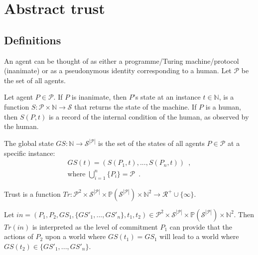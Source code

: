 \section{Abstract trust}
  \subsection{Definitions}
    \begin{definition}[Agent]
       An agent can be thought of as either a programme/Turing machine/protocol (inanimate) or as a pseudonymous identity
       corresponding to a human. Let $\mathcal{P}$ be the set of all agents.
    \end{definition}
    \begin{definition}[State]
      Let agent $P \in \mathcal{P}$. If $P$ is inanimate, then $P$'s state at an instance $t \in \mathbb{N}$, is a function $S :
      \mathcal{P} \times \mathbb{N} \rightarrow \mathcal{S}$ that returns the state of the machine. If $P$ is a human, then
      $S\left(P, t\right)$ is a record of the internal condition of the human, as observed by the human.
    \end{definition}
    \begin{definition}
      The global state $GS : \mathbb{N} \rightarrow \mathcal{S}^{|\mathcal{P}|}$ is the set of the states of all agents $P \in
      \mathcal{P}$ at a specific instance: 
      \begin{gather*}
        GS\left(t\right) = \left(S\left(P_1, t\right), ...,S\left(P_n, t\right)\right) \enspace, \\
        \mbox{where } \bigcup\limits_{i = 1}^n\{P_i\} = \mathcal{P} \enspace.
      \end{gather*}
    \end{definition}
    \begin{definition}[Trust]
      Trust is a function $Tr : \mathcal{P}^2 \times \mathcal{S}^{|\mathcal{P}|} \times
      \mathbb{P}\left(\mathcal{S}^{|\mathcal{P}|}\right) \times \mathbb{N}^2 \rightarrow \mathcal{R}^{+} \cup \{\infty\}$.
    \end{definition}
    \noindent Let $in = \left(P_1, P_2, GS_1, \{GS'_1, ...,GS'_n\}, t_1, t_2\right) \in \mathcal{P}^2 \times
    \mathcal{S}^{|\mathcal{P}|} \times \mathbb{P}\left(\mathcal{S}^{|\mathcal{P}|}\right) \times \mathbb{N}^2$. Then
    $Tr\left(in\right)$ is interpreted as the level of commitment $P_1$ can provide that the actions of $P_2$ upon a world where
    $GS\left(t_1\right) = GS_1$ will lead to a world where $GS\left(t_2\right) \in \{GS'_1, ...,GS'_n\}$.

